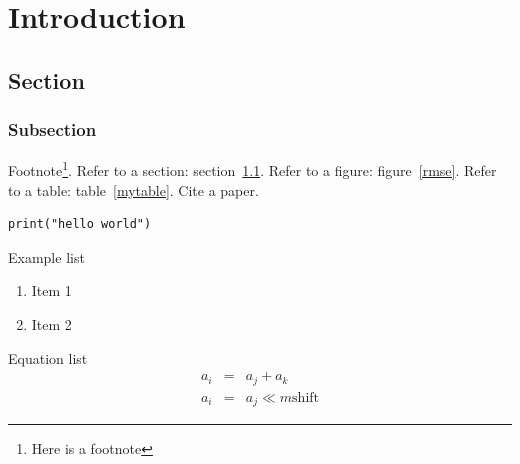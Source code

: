 \chapter{Introduction}

\section{Section}\label{sec}

\subsection{Subsection}

Footnote\footnote{Here is a footnote}.
Refer to a section: section~\ref{sec}.
Refer to a figure: figure~\ref{rmse}.
Refer to a table: table~\ref{mytable}.
Cite a paper\cite{chien2002dynamic}.

\begin{lstlisting}
print("hello world")
\end{lstlisting}

Example list
\begin{enumerate}
  \item Item 1
  \item Item 2
\end{enumerate}

Equation list
\begin{eqnarray*}
a_i & = & a_j + a_k \\
a_i & = & a_j \ll m \mbox{shift}
\end{eqnarray*}


